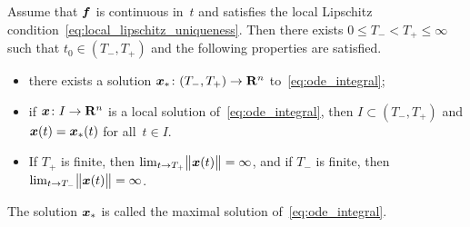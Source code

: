 \begin{corollary}
    \label{corollary:maximal_solutions}
    Assume that $\vect f$ is continuous in~$t$ and satisfies the local Lipschitz condition~\eqref{eq:local_lipschitz_uniqueness}.
    Then there exists $0 \leq T_- < T_+ \leq \infty$ such that $t_0 \in (T_-, T_+)$ and
    the following properties are satisfied.
    \begin{itemize}
        \item
            there exists a solution $\vect x_* \colon (T_-, T_+) \to \real^n$ to~\eqref{eq:ode_integral};

        \item
            if $\vect x\colon I \to \real^n$ is a local solution of~\eqref{eq:ode_integral},
            then $I \subset (T_-, T_+)$ and $\vect x(t) = \vect x_*(t)$ for all~$t \in I$.

        \item
            If $T_+$ is finite, then $\lim_{t \to T_+} \vecnorm[\big]{\vect x(t)} = \infty$,
            and if $T_-$ is finite,
            then $\lim_{t \to T_-} \vecnorm[\big]{\vect x(t)} = \infty$.
    \end{itemize}
    The solution $\vect x_*$ is called the maximal solution of~\eqref{eq:ode_integral}.
\end{corollary}
